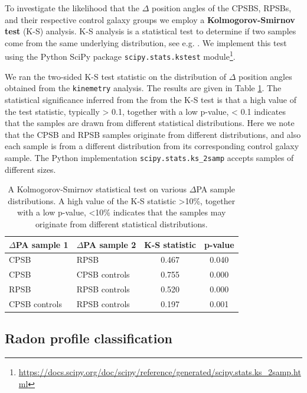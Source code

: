 To investigate the likelihood that the $\Delta$ position angles of the CPSBS, RPSBs, and their respective control galaxy groups we employ a \textbf{Kolmogorov-Smirnov test} (K-S) analysis. K-S analysis is a statistical test to determine if two samples come from the same underlying distribution, see e.g. \citet{hodges1958significance}. We implement this test using the Python SciPy package \texttt{scipy.stats.kstest} module\footnote{\href{}{https://docs.scipy.org/doc/scipy/reference/generated/scipy.stats.ks\_2samp.html}}.

We ran the two-sided K-S test statistic on the distribution of $\Delta$ position angles obtained from the \texttt{kinemetry} analysis. The results are given in Table \ref{tab:K-S-tests}. The statistical significance inferred from the from the K-S test is that a high value of the test statistic, typically > 0.1, together with a low p-value, < 0.1 indicates that the samples are drawn from different statistical distributions. Here we note that the CPSB and RPSB samples originate from different distributions, and also each sample is from a different distribution from its corresponding control galaxy sample. The Python implementation \texttt{scipy.stats.ks\_2samp} accepts samples of different sizes.

\begin{table}
\caption[Kolmogorov-Smirnov statistical test of $\Delta$PA distributions]{A Kolmogorov-Smirnov statistical test on various $\Delta$PA sample distributions. A high value of the K-S statistic \textgreater 10\%, together with a low p-value, \textless 10\% indicates that the samples may originate from different statistical distributions.}
\label{tab:K-S-tests}
\begin{tabular}{llcc}
\hline
$\Delta$PA sample 1  & $\Delta$PA sample 2 & K-S statistic & p-value \\
\hline
CPSB & RPSB & 0.467 & 0.040 \\
CPSB & CPSB controls & 0.755 & 0.000 \\
RPSB & RPSB controls & 0.520 & 0.000 \\
CPSB controls & RPSB controls & 0.197 & 0.001 \\
\hline
\end{tabular}
\end{table}

\subsection{Radon profile classification}
\label{sec:Radon-profile-classification}

